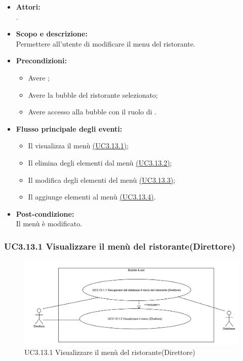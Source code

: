 \begin{itemize}
	\item \textbf{Attori:}
	\\.
	\item \textbf{Scopo e descrizione:} 
	\\Permettere all’utente  di modificare il menu del ristorante.
	\item \textbf{Precondizioni:}
	\begin{itemize}
		\item Avere ;
		\item Avere la bubble del ristorante selezionato;
		\item Avere accesso alla bubble con il ruolo di .
	\end{itemize}
	\item \textbf{Flusso principale degli eventi:}
	\begin{itemize}
		\item Il  visualizza il menù \hyperref[UC3.13.1]{(UC3.13.1)};
		\item Il  elimina degli elementi dal menù \hyperref[UC3.13.2]{(UC3.13.2)};
		\item Il  modifica degli elementi del menù \hyperref[UC3.13.3]{(UC3.13.3)};
		\item Il  aggiunge elementi al menù \hyperref[UC3.13.4]{(UC3.13.4)}.
	\end{itemize}
	\item \textbf{Post-condizione:}
	\\Il menù è modificato.
\end{itemize}

\subsubsection{UC3.13.1 Visualizzare il menù del ristorante(Direttore)} \label{UC3.13.1}

\begin{figure}[H]
	\centering
	\includegraphics[width=15cm]{../../documenti/AnalisiDeiRequisiti/Diagrammi_img/uc3_13_1.png}
	\caption{UC3.13.1 Visualizzare il menù del ristorante(Direttore)}
\end{figure}

